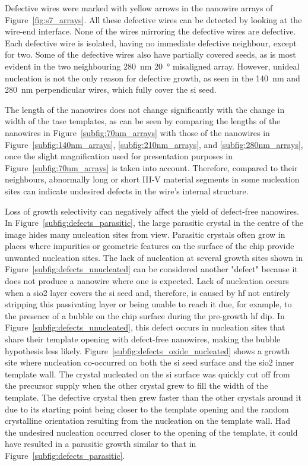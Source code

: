 Defective wires were marked with yellow arrows in the nanowire arrays of Figure~\ref{fig:s7_arrays}. All these defective wires can be detected by looking at the wire-end interface. None of the wires mirroring the defective wires are defective. Each defective wire is isolated, having no immediate defective neighbour, except for two. Some of the defective wires also have partially covered seeds, as is most evident in the two neighbouring \qty{280}{\nano\metre} \qty{20}{\degree} misaligned array. However, unideal nucleation is not the only reason for defective growth, as seen in the \qty{140}{\nano\metre} and \qty{280}{\nano\metre} perpendicular wires, which fully cover the \acl{si} seed.

The length of the nanowires does not change significantly with the change in width of the \acs{tase} templates, as can be seen by comparing the lengths of the nanowires in Figure~\ref{subfig:70nm_arrays} with those of the nanowires in Figure~\ref{subfig:140nm_arrays}, \ref{subfig:210nm_arrays}, and \ref{subfig:280nm_arrays}, once the slight magnification used for presentation purposes in Figure~\ref{subfig:70nm_arrays} is taken into account. Therefore, compared to their neighbours, abnormally long or short III-V material segments in some nucleation sites can indicate undesired defects in the wire's internal structure.

Loss of growth selectivity can negatively affect the yield of defect-free nanowires. In Figure~\ref{subfig:defects_parasitic}, the large parasitic crystal in the centre of the image hides many nucleation sites from view. Parasitic crystals often grow in places where impurities or geometric features on the surface of the chip provide unwanted nucleation sites. The lack of nucleation at several growth sites shown in Figure~\ref{subfig:defects_unucleated} can be considered another "defect" because it does not produce a nanowire where one is expected. Lack of nucleation occurs when a \acs{sio2} layer covers the \acl{si} seed and, therefore, is caused by \acf{hf} not entirely stripping this passivating layer or being unable to reach it due, for example, to the presence of a bubble on the chip surface during the pre-growth \acs{hf} dip. In Figure~\ref{subfig:defects_unucleated}, this defect occurs in nucleation sites that share their template opening with defect-free nanowires, making the bubble hypothesis less likely. Figure~\ref{subfig:defects_oxide_nucleated} shows a growth site where nucleation co-occurred on both the \acl{si} seed surface and the \acs{sio2} inner template wall. The crystal nucleated on the \acl{si} surface was quickly cut off from the precursor supply when the other crystal grew to fill the width of the template. The defective crystal then grew faster than the other crystals around it due to its starting point being closer to the template opening and the random crystalline orientation resulting from the nucleation on the template wall. Had the undesired nucleation occurred closer to the opening of the template, it could have resulted in a parasitic growth similar to that in Figure~\ref{subfig:defects_parasitic}.

